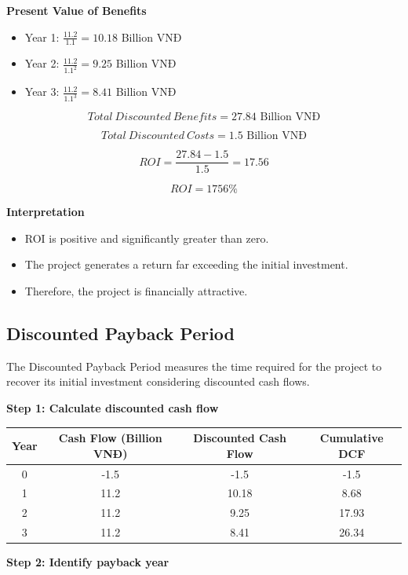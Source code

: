 \textbf{Present Value of Benefits}

\begin{itemize}
\item Year 1: $ \frac{11.2}{1.1} = 10.18$ Billion VNĐ
\item Year 2: $ \frac{11.2}{1.1^2} = 9.25$ Billion VNĐ
\item Year 3: $ \frac{11.2}{1.1^3} = 8.41$ Billion VNĐ
\end{itemize}

\[
Total\ Discounted\ Benefits = 27.84 \text{ Billion VNĐ}
\]

\[
Total\ Discounted\ Costs = 1.5 \text{ Billion VNĐ}
\]

\[
ROI = \frac{27.84 - 1.5}{1.5} = 17.56
\]

\[
ROI = 1756\%
\]

\textbf{Interpretation}

\begin{itemize}
\item ROI is positive and significantly greater than zero.
\item The project generates a return far exceeding the initial investment.
\item Therefore, the project is financially attractive.
\end{itemize}

\subsection{Discounted Payback Period}

The Discounted Payback Period measures the time required for the project to recover its initial investment considering discounted cash flows.

\textbf{Step 1: Calculate discounted cash flow}

\begin{center}
\begin{tabular}{|c|c|c|c|}
\hline
Year & Cash Flow (Billion VNĐ) & Discounted Cash Flow & Cumulative DCF \\
\hline
0 & -1.5 & -1.5 & -1.5 \\
1 & 11.2 & 10.18 & 8.68 \\
2 & 11.2 & 9.25 & 17.93 \\
3 & 11.2 & 8.41 & 26.34 \\
\hline
\end{tabular}
\end{center}

\textbf{Step 2: Identify payback year}

